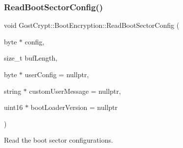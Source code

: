 \subsubsection{\texorpdfstring{Read\+Boot\+Sector\+Config()}{ReadBootSectorConfig()}}
{\footnotesize\ttfamily void Gost\+Crypt\+::\+Boot\+Encryption\+::\+Read\+Boot\+Sector\+Config (\begin{DoxyParamCaption}\item[{byte $\ast$}]{config,  }\item[{size\+\_\+t}]{buf\+Length,  }\item[{byte $\ast$}]{user\+Config = {\ttfamily nullptr},  }\item[{string $\ast$}]{custom\+User\+Message = {\ttfamily nullptr},  }\item[{uint16 $\ast$}]{boot\+Loader\+Version = {\ttfamily nullptr} }\end{DoxyParamCaption})}



Read the boot sector configurations. 


